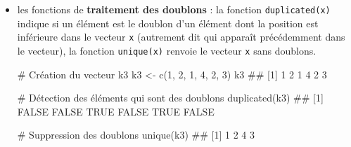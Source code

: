 \documentclass[12pt,twosided, notitlepage]{book}
\newenvironment{Shaded}{}{}
\newcommand{\KeywordTok}[1]{\textcolor[rgb]{0.00,0.00,1.00}{{#1}}}
\newcommand{\DecValTok}[1]{{#1}}
\newcommand{\StringTok}[1]{\textcolor[rgb]{0.00,0.50,0.50}{{#1}}}
\newcommand{\CommentTok}[1]{\textcolor[rgb]{0.00,0.50,0.00}{{#1}}}
\newcommand{\NormalTok}[1]{{#1}}
\renewenvironment{Shaded}{\begin{snugshade}}{\end{snugshade}}
\begin{document}
\begin{itemize}
\item
  les fonctions de \textbf{traitement des doublons} : la fonction
  \texttt{duplicated(x)} indique si un
  élément est le doublon d'un élément dont la position est inférieure
  dans le vecteur \texttt{x} (autrement dit qui apparaît précédemment
  dans le vecteur), la fonction
  \texttt{unique(x)} renvoie le vecteur
  \texttt{x} sans doublons.

\begin{Shaded}
\begin{Highlighting}[]
\CommentTok{# Création du vecteur k3}
\NormalTok{k3 <-}\StringTok{ }\KeywordTok{c}\NormalTok{(}\DecValTok{1}\NormalTok{, }\DecValTok{2}\NormalTok{, }\DecValTok{1}\NormalTok{, }\DecValTok{4}\NormalTok{, }\DecValTok{2}\NormalTok{, }\DecValTok{3}\NormalTok{)}
\NormalTok{k3}
  \NormalTok{## [1] 1 2 1 4 2 3}

\CommentTok{# Détection des éléments qui sont des doublons}
\KeywordTok{duplicated}\NormalTok{(k3)}
  \NormalTok{## [1] FALSE FALSE  TRUE FALSE  TRUE FALSE}

\CommentTok{# Suppression des doublons}
\KeywordTok{unique}\NormalTok{(k3)}
  \NormalTok{## [1] 1 2 4 3}
\end{Highlighting}
\end{Shaded}
\end{itemize}

~
\end{document}
